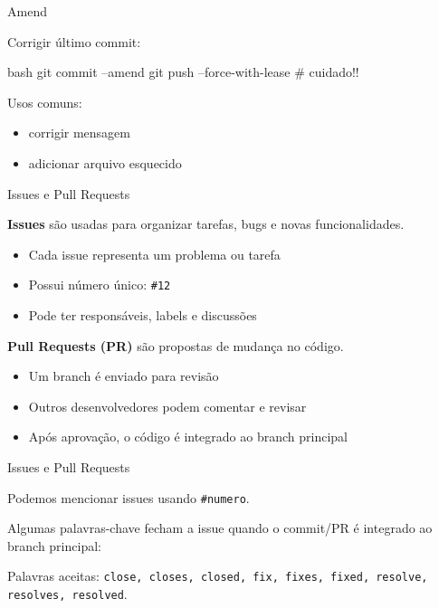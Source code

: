 \documentclass[xcolor=dvipsnames,t,aspectratio=169]{beamer}
\newcommand{\highlight}[1]{{\color{nes_dark_orange} #1}}
\begin{document}
\begin{frame}[c, fragile]{Amend}

Corrigir último commit:

\begin{code}[Amend]{bash}
git commit --amend
git push --force-with-lease # cuidado!!
\end{code}

Usos comuns:

\begin{itemize}

\item corrigir mensagem
\item adicionar arquivo esquecido
\end{itemize}

\end{frame}

\begin{frame}[c, fragile]{Issues e Pull Requests}

\textbf{Issues} são usadas para organizar tarefas, bugs e novas funcionalidades.

\begin{itemize}
\item Cada issue representa um \highlight{problema ou tarefa}
\item Possui número único: \texttt{\#12}
\item Pode ter responsáveis, labels e discussões
\end{itemize}

\textbf{Pull Requests (PR)} são propostas de mudança no código.

\begin{itemize}
\item Um branch é enviado para revisão
\item Outros desenvolvedores podem comentar e revisar
\item Após aprovação, o código é integrado ao branch principal
\end{itemize}

\end{frame}

\begin{frame}[c, fragile]{Issues e Pull Requests}


Podemos mencionar issues usando \texttt{\#numero}.



Algumas palavras-chave fecham a issue quando o commit/PR é integrado ao branch principal:


Palavras aceitas: \texttt{close, closes, closed, fix, fixes, fixed, resolve, resolves, resolved}.

\end{frame}
\end{document}
